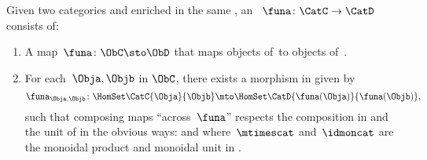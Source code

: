 \begin{ctdefinition}
    \label{def:enrichedfunctor}
    Given two categories \CatC and \CatD enriched in the same  \CatV, an ~$\funa\colon \CatC \to \CatD$ consists of:
    \begin{enumerate}
        \item A map~$\funa\colon \ObC \sto \ObD$ that maps objects of~\CatC to objects of~\CatD.
        \item For each~$\Obja, \Objb$ in $\ObC$, there exists a morphism in \CatV given by
              \begin{equation}
                  \funa_{\Obja, \Objb} \colon \HomSet\CatC{\Obja}{\Objb} \mto \HomSet\CatD{\funa(\Obja)}{\funa(\Objb)},
              \end{equation}
              such that composing maps ``across~$\funa$'' respects the composition in \CatC and the unit of \CatV in the obvious ways:
              and
              where~$\mtimescat$ and~$\idmoncat$ are the monoidal product and monoidal unit in \CatV.
    \end{enumerate}
\end{ctdefinition}


